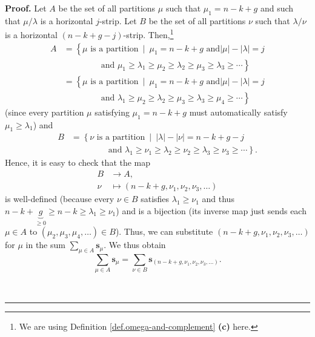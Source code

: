 \documentclass[numbers=enddot,12pt,final,onecolumn,notitlepage]{scrartcl}%
\theoremstyle{definition}
\newenvironment{proof}[1][Proof]{\noindent\textbf{#1.} }{\ \rule{0.5em}{0.5em}}
\let\sumnonlimits\sum
\renewcommand{\sum}{\sumnonlimits\limits}
\begin{document}
\begin{proof}
Let $A$ be the set of all partitions $\mu$ such that $\mu_{1}=n-k+g$ and such
that $\mu/\lambda$ is a horizontal $j$-strip. Let $B$ be the set of all
partitions $\nu$ such that $\lambda/\nu$ is a horizontal $\left(
n-k+g-j\right)  $-strip. Then,\footnote{We are using Definition
\ref{def.omega-and-complement} \textbf{(c)} here.}%
\begin{align*}
A  &  =\left\{  \mu\text{ is a partition}\ \mid\ \mu_{1}=n-k+g\text{ and
}\left\vert \mu\right\vert -\left\vert \lambda\right\vert =j\right. \\
&  \ \ \ \ \ \ \ \ \ \ \ \ \ \ \ \ \ \ \ \ \left.  \text{and }\mu_{1}%
\geq\lambda_{1}\geq\mu_{2}\geq\lambda_{2}\geq\mu_{3}\geq\lambda_{3}\geq
\cdots\right\} \\
&  =\left\{  \mu\text{ is a partition}\ \mid\ \mu_{1}=n-k+g\text{ and
}\left\vert \mu\right\vert -\left\vert \lambda\right\vert =j\right. \\
&  \ \ \ \ \ \ \ \ \ \ \ \ \ \ \ \ \ \ \ \ \left.  \text{and }\lambda_{1}%
\geq\mu_{2}\geq\lambda_{2}\geq\mu_{3}\geq\lambda_{3}\geq\mu_{4}\geq
\cdots\right\}
\end{align*}
(since every partition $\mu$ satisfying $\mu_{1}=n-k+g$ must automatically
satisfy $\mu_{1}\geq\lambda_{1}$) and%
\begin{align*}
B  &  =\left\{  \nu\text{ is a partition}\ \mid\ \left\vert \lambda\right\vert
-\left\vert \nu\right\vert =n-k+g-j\right. \\
&  \ \ \ \ \ \ \ \ \ \ \ \ \ \ \ \ \ \ \ \ \left.  \text{and }\lambda_{1}%
\geq\nu_{1}\geq\lambda_{2}\geq\nu_{2}\geq\lambda_{3}\geq\nu_{3}\geq
\cdots\right\}  .
\end{align*}
Hence, it is easy to check that the map%
\begin{align*}
B  &  \rightarrow A,\\
\nu &  \mapsto\left(  n-k+g,\nu_{1},\nu_{2},\nu_{3},\ldots\right)
\end{align*}
is well-defined (because every $\nu\in B$ satisfies $\lambda_{1}\geq\nu_{1}$
and thus $n-k+\underbrace{g}_{\geq0}\geq n-k\geq\lambda_{1}\geq\nu_{1}$) and
is a bijection (its inverse map just sends each $\mu\in A$ to $\left(  \mu
_{2},\mu_{3},\mu_{4},\ldots\right)  \in B$). Thus, we can substitute $\left(
n-k+g,\nu_{1},\nu_{2},\nu_{3},\ldots\right)  $ for $\mu$ in the sum $\sum
_{\mu\in A}\mathbf{s}_{\mu}$. We thus obtain%
\begin{equation}
\sum_{\mu\in A}\mathbf{s}_{\mu}=\sum_{\nu\in B}\mathbf{s}_{\left(
n-k+g,\nu_{1},\nu_{2},\nu_{3},\ldots\right)  }.
\label{pf.lem.pieri-hall.Lam1.1}%
\end{equation}



\end{proof}
\end{document}
